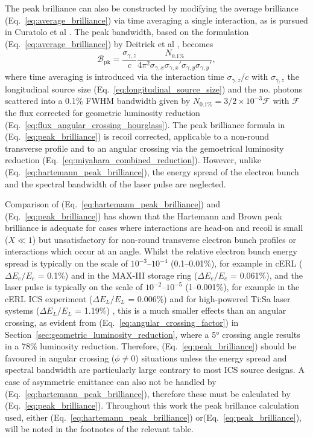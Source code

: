 \documentclass[../main.tex]{subfiles}
\begin{document}
The peak brilliance can also be constructed by modifying the average brilliance (Eq.~\ref{eq:average_brilliance}) via time averaging a single interaction, as is pursued in Curatolo et al \cite{curatolo2017analytical}. The peak bandwidth, based on the formulation (Eq.~\ref{eq:average_brilliance}) by Deitrick et al \cite{deitrick2018high}, becomes
\begin{equation}
\mathcal{B}_{\mathrm{pk}} = \frac{\sigma_{\gamma,z}}{c}\frac{N_{0.1\%}}{4\pi^{2}\sigma_{\gamma,x}\sigma_{\gamma,x}'\sigma_{\gamma,y}\sigma_{\gamma,y}'},
\label{eq:peak_brilliance}    
\end{equation}
where time averaging is introduced via the interaction time $\sigma_{\gamma,z}/c$ with $\sigma_{\gamma,z}$ the longitudinal source size (Eq.~\ref{eq:longitudinal_source_size}) and the no. photons scattered into a 0.1\% FWHM bandwidth given by $N_{0.1\%} = 3/2\times 10^{-3}\mathcal{F}$ with $\mathcal{F}$ the flux corrected for geometric luminosity reduction (Eq.~\ref{eq:flux_angular_crossing_hourglass}). The peak brilliance formula in (Eq.~\ref{eq:peak_brilliance}) is recoil corrected, applicable to a non-round transverse profile and to an angular crossing via the gemoetrical luminosity reduction (Eq.~\ref{eq:miyahara_combined_reduction}). However, unlike (Eq.~\ref{eq:hartemann_peak_brilliance}), the energy spread of the electron bunch and the spectral bandwidth of the laser pulse are neglected. 

Comparison of (Eq.~\ref{eq:hartemann_peak_brilliance}) and (Eq.~\ref{eq:peak_brilliance}) has shown that the Hartemann and Brown peak brilliance is adequate for cases where interactions are head-on and recoil is small ($X \ll 1$) but unsatisfactory for non-round transverse electron bunch profiles or interactions which occur at an angle. Whilst the relative electron bunch energy spread is typically on the scale of $10^{-3}$--$10^{-4}$ (0.1--0.01\%), for example in cERL \cite{akagi2016narrow} ($\Delta E_{e}/E_{e}$ = 0.1\%) and in the MAX-III storage ring \cite{sjostrom2009max} ($\Delta E_{e}/E_{e}$ = 0.061\%), and the laser pulse is typically on the scale of $10^{-2}$--$10^{-5}$ (1--0.001\%), for example in the cERL ICS experiment ($\Delta E_{L}/E_{L}$ = 0.006\%) \cite{akagi2016narrow} and for high-powered Ti:Sa laser systems ($\Delta E_{L}/E_{L}$ = 1.19\%) \cite{liu2021review}, this is a much smaller effects than an angular crossing, as evident from (Eq.~\ref{eq:angular_crossing_factor}) in Section~\ref{sec:geometric_luminosity_reduction}, where a 5\si{\degree} crossing angle results in a 78\% luminosity reduction. Therefore, (Eq.~\ref{eq:peak_brilliance}) should be favoured in angular crossing ($\phi\neq 0$) situations unless the energy spread and spectral bandwidth are particularly large contrary to most ICS source designs. A case of asymmetric emittance can also not be handled by (Eq.~\ref{eq:hartemann_peak_brilliance}), therefore these must be calculated by (Eq.~\ref{eq:peak_brilliance}). Throughout this work the peak brillance calculation used, either (Eq.~\ref{eq:hartemann_peak_brilliance}) or(Eq.~\ref{eq:peak_brilliance}), will be noted in the footnotes of the relevant table.  
\end{document}
